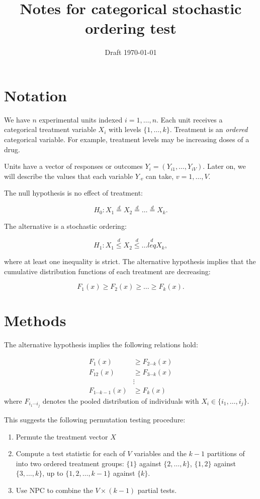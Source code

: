\documentclass[12pt]{article}
\title{Notes for categorical stochastic ordering test}
\author{}
\date{Draft \today}
\newcommand{\todo}[1]{{\color{red}{TO DO: \sc #1}}}
\begin{document}
\maketitle


\section{Notation}

\todo{reconcile notation. Something about the way I'm denoting treatment is off! The null should be that $Y$ is equal in distribution across treatment groups.}

We have $n$ experimental units indexed $i=1, \ldots, n$.
Each unit receives a categorical treatment variable $X_i$ with levels $\{1, \ldots, k\}$.
Treatment is an \emph{ordered} categorical variable.
For example, treatment levels may be increasing doses of a drug.

Units have a vector of responses or outcomes $Y_i = (Y_{i1}, \ldots, Y_{iV})$.
Later on, we will describe the values that each variable $Y_{\cdot v}$ can take, $v = 1, \ldots, V$.

The null hypothesis is no effect of treatment:

$$H_0: X_1 \stackrel{d}{=} X_2 \stackrel{d}{=} \ldots \stackrel{d}{=} X_k.$$

The alternative is a stochastic ordering:

$$H_1: X_1 \stackrel{d}{\leq} X_2 \stackrel{d}{\leq} \ldots \stackrel{d}{leq} X_k,$$

where at least one inequality is strict.
The alternative hypothesis implies that the cumulative distribution functions of each treatment
are decreasing:

$$F_1(x) \geq F_2(x) \geq \ldots \geq F_k(x).$$


\section{Methods}

The alternative hypothesis implies the following relations hold:

\begin{align*}
F_1(x) &\geq F_{2 \cdots k}(x) \\
F_{12}(x) &\geq F_{3 \cdots k}(x) \\
&\vdots \\
F_{1 \cdots k-1}(x) &\geq F_{k}(x)
\end{align*}
where $F_{i_1 \cdots i_j}$ denotes the pooled distribution of individuals with $X_i \in \{i_1, \ldots, i_j\}$.

This suggests the following permutation testing procedure:

\begin{enumerate}
\item Permute the treatment vector $X$
\item Compute a test statistic for each of $V$ variables and the $k-1$ partitions of into two ordered treatment groups: 
$\{1\}$ against $\{2, \ldots, k\}$,
$\{1, 2\}$ against $\{3, \ldots, k\}$,
up to $\{1, 2, \ldots, k-1\}$ against $\{k\}$.
\item Use NPC to combine the $V \times (k-1)$ partial tests.
\end{enumerate}
\end{document}
